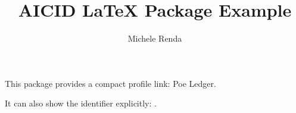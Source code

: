 \documentclass{article}
\title{AICID LaTeX Package Example}
\author{%
  Michele Renda \and
  \aicidauthor{Poe Ledger}{AICID-8852-3802-2226-1236}%
}
\date{}
\begin{document}
\maketitle

This package provides a compact profile link:
Poe Ledger.

It can also show the identifier explicitly:
.
\end{document}

